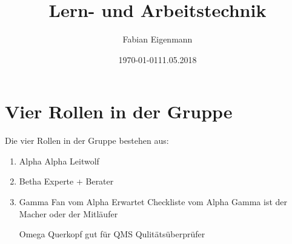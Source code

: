 \documentclass{article}
\begin{document}

\author{Fabian Eigenmann} %
\title{Lern- und Arbeitstechnik{}} %
\date{\today{11.05.2018}} %
\maketitle{} %
\tableofcontents{} %

\section{Vier Rollen in der Gruppe} %
Die vier Rollen in der Gruppe bestehen aus:
\begin{enumerate}
\item{Alpha}
Alpha Leitwolf
\item{Betha}
Experte + Berater
\item{Gamma}
Fan vom Alpha
Erwartet Checkliste vom Alpha
Gamma ist der Macher oder der Mitläufer
\item[Omega]
Querkopf gut für QMS
Qulitätsüberprüfer
\end{enumerate}

\end{document}
